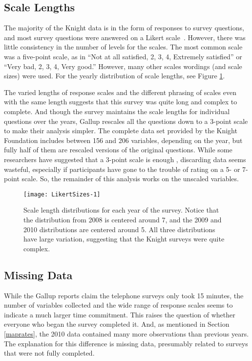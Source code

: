 \documentclass[smallextended]{svjour3}\usepackage[]{graphicx}\usepackage[]{color}
\newenvironment{knitrout}{}{} %
\begin{document}
\subsection{Scale Lengths}
The majority of the Knight data is in the form of responses to survey questions, and most survey questions were answered on a Likert scale~\citep{Lik1932}. However, there was little consistency in the number of levels for the scales. The most common scale was a five-point scale, as in ``Not at all satisfied, 2, 3, 4, Extremely satisfied'' or ``Very bad, 2, 3, 4, Very good.'' However, many other scales wordings (and scale sizes) were used. For the yearly distribution of scale lengths, see Figure \ref{fig:LikertSizes}.



The varied lengths of response scales and the different phrasing of scales even with the same length suggests that this survey was quite long and complex to complete. And though the survey maintains the scale lengths for individual questions over the years, Gallup rescales all the questions down to a 3-point scale to make their analysis simpler. The complete data set provided by the Knight Foundation includes between 156 and 206 variables, depending on the year, but fully half of them are rescaled versions of the original questions. While some researchers have suggested that a 3-point scale is enough \citep{JacMat1971}, discarding data seems wasteful, especially if participants have gone to the trouble of rating on a 5- or 7-point scale. So, the remainder of this analysis works on the unscaled variables. 
\begin{knitrout}
\color{fgcolor}\begin{figure}

{\centering \texttt{[image: LikertSizes-1]} 

}

\caption[Scale length distributions for each year of the survey]{Scale length distributions for each year of the survey. Notice that the distribution from 2008 is centered around 7, and the 2009 and 2010 distributions are centered around 5. All three distributions have large variation, suggesting that the Knight surveys were quite complex.}\label{fig:LikertSizes}
\end{figure}


\end{knitrout}

\subsection{Missing Data}
\label{missingdata}
While the Gallup reports claim the telephone surveys only took 15 minutes, the number of variables collected and the wide range of response scales seems to indicate a much larger time commitment. This raises the question of whether everyone who began the survey completed it. And, as mentioned in Section \ref{maprates}, the 2010 data contained many more observations than previous years. The explanation for this difference is missing data, presumably related to surveys that were not fully completed. 
\end{document}

